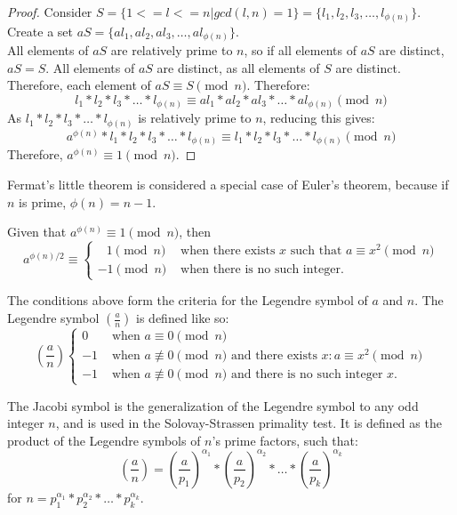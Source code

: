 \documentclass{article}
\begin{document}
\begin{proof}
    Consider $S = \{1 <= l <= n | gcd(l, n) = 1\} = \{l_1, l_2, l_3, \ldots{}, l_{\phi(n)}\}$.
    Create a set $aS = \{al_1, al_2, al_3, \ldots{}, al_{\phi(n)}\}$. \\
    All elements of $aS$ are relatively prime to $n$, so if all elements of $aS$ are distinct, $aS = S$. All elements of $aS$ are distinct, as all elements of $S$ are distinct. Therefore, each element of $aS \equiv S \pmod{n}$.
    Therefore:
    \[
        l_1 * l_2 * l_3 * \ldots{} * l_{\phi(n)} \equiv al_1 * al_2 * al_3 * \ldots{} * al_{\phi(n)} \pmod{n}
    \]
    As $l_1 * l_2 * l_3 * \ldots{} * l_{\phi(n)}$ is relatively prime to $n$, reducing this gives:
    \[
        a^{\phi(n)} * l_1 * l_2 * l_3 * \ldots{} * l_{\phi(n)} \equiv l_1 * l_2 * l_3 * \ldots{} * l_{\phi(n)} \pmod{n}
    \]
    Therefore, $a^{\phi(n)} \equiv 1 \pmod{n}$.
\end{proof}

Fermat's little theorem is considered a special case of Euler's theorem, because if $n$ is prime, $\phi(n) = n - 1$.

Given that $a^{\phi(n)} \equiv 1 \pmod{n}$, then 
\[
    a^{\phi(n) / 2} \equiv \begin{cases}
\;\;\,1\pmod{n}& \text{ when there exists }x \text{ such that }a\equiv x^2 \pmod{n}\\
     -1\pmod{n}& \text{ when there is no such integer.}
\end{cases}
\]

The conditions above form the criteria for the Legendre symbol of $a$ and $n$. The Legendre symbol $(\frac{a}{n})$ is defined like so:
\[
    (\frac{a}{n}) \begin{cases}
        0 & \text{ when $a \equiv 0 \pmod{n}$} \\
        -1& \text{ when $a \not\equiv 0 \pmod{n}$ and there exists $x: a \equiv x^2 \pmod{n}$} \\
     -1& \text{ when $a \not\equiv 0 \pmod{n}$ and there is no such integer $x$.}
\end{cases}
\]

The Jacobi symbol is the generalization of the Legendre symbol to any odd integer $n$, and is used in the Solovay-Strassen primality test. It is defined as the product of the Legendre symbols of $n$'s prime factors, such that:
\[
    (\frac{a}{n}) = (\frac{a}{p_1})^{\alpha_{1}} * (\frac{a}{p_2})^{\alpha_{2}} * \ldots{} * (\frac{a}{p_k})^{\alpha_{k}}
\]
for $n = p_1^{\alpha_{1}} * p_2^{\alpha_{2}} * \ldots{} * p_k^{\alpha_{k}}$.
\end{document}
